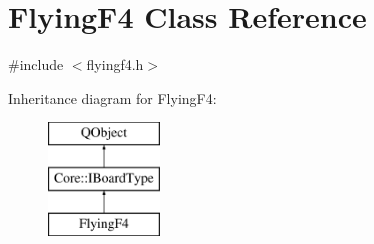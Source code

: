 \hypertarget{class_flying_f4}{\section{Flying\-F4 Class Reference}
\label{class_flying_f4}
}


{\ttfamily \#include $<$flyingf4.\-h$>$}

Inheritance diagram for Flying\-F4\-:\begin{figure}[H]
\begin{center}
\leavevmode
\includegraphics[height=3.000000cm]{class_flying_f4}
\end{center}
\end{figure}
